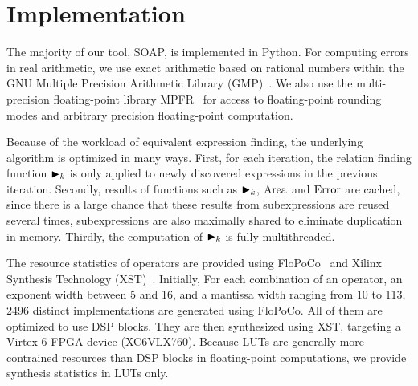 \section{Implementation}
\label{so:sec:implementation}

The majority of our tool, SOAP, is implemented in Python. For computing
errors in real arithmetic, we use exact arithmetic based on rational numbers
within the GNU Multiple Precision Arithmetic Library (GMP)~\cite{gmp}. We
also use the multi-precision floating-point library MPFR~\cite{mpfr} for
access to floating-point rounding modes and arbitrary precision floating-point
computation.

Because of the workload of equivalent expression finding, the underlying
algorithm is optimized in many ways. First, for each iteration, the relation
finding function $\operatorname{\blacktriangleright}_k$ is only applied to newly discovered expressions
in the previous iteration. Secondly, results of functions such as $\operatorname{\blacktriangleright}_k$,
$\operatorname{\mathrm{Area}}$ and $\operatorname{\mathrm{Error}}$ are cached, since there is a large chance that these
results from subexpressions are reused several times, subexpressions are also
maximally shared to eliminate duplication in memory. Thirdly, the computation
of $\operatorname{\blacktriangleright}_k$ is fully multithreaded.

The resource statistics of operators are provided using FloPoCo~\cite{flopoco}
and Xilinx Synthesis Technology (XST)~\cite{xst}. Initially, For each
combination of an operator, an exponent width between 5 and 16, and a mantissa
width ranging from 10 to 113, 2496 distinct implementations are generated
using FloPoCo. All of them are optimized to use DSP blocks. They are then
synthesized using XST, targeting a Virtex-6 FPGA device (XC6VLX760). Because
LUTs are generally more contrained resources than DSP blocks in floating-point
computations, we provide synthesis statistics in LUTs only.
